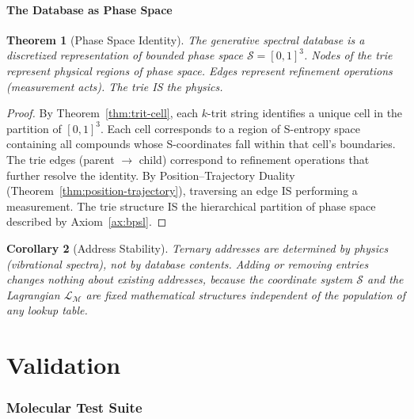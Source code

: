 \documentclass[11pt,twocolumn,a4paper]{article}
\newtheorem{theorem}{Theorem}[section]
\newtheorem{corollary}[theorem]{Corollary}
\theoremstyle{definition}
\theoremstyle{remark}
\newcommand{\Sspace}{\mathcal{S}}
\newcommand{\Depth}{\mathcal{M}}
\newcommand{\Lagr}{\mathcal{L}}
\begin{document}
\subsection{The Database as Phase Space}
\label{sec:database-as-phase-space}

\begin{theorem}[Phase Space Identity]
\label{thm:phase-space-identity}
The generative spectral database \emph{is} a discretized representation of bounded phase space $\Sspace = [0,1]^3$. Nodes of the trie represent physical regions of phase space. Edges represent refinement operations (measurement acts). The trie IS the physics.
\end{theorem}

\begin{proof}
By Theorem~\ref{thm:trit-cell}, each $k$-trit string identifies a unique cell in the partition of $[0,1]^3$. Each cell corresponds to a region of S-entropy space containing all compounds whose S-coordinates fall within that cell's boundaries. The trie edges (parent $\to$ child) correspond to refinement operations that further resolve the identity. By Position--Trajectory Duality (Theorem~\ref{thm:position-trajectory}), traversing an edge IS performing a measurement. The trie structure IS the hierarchical partition of phase space described by Axiom~\ref{ax:bpsl}.
\end{proof}

\begin{corollary}[Address Stability]
\label{cor:stability}
Ternary addresses are determined by physics (vibrational spectra), not by database contents. Adding or removing entries changes nothing about existing addresses, because the coordinate system $\Sspace$ and the Lagrangian $\Lagr_\Depth$ are fixed mathematical structures independent of the population of any lookup table.
\end{corollary}

\part{Validation}
\label{part:validation}

\section{Molecular Test Suite}
\label{sec:validation}
\end{document}
